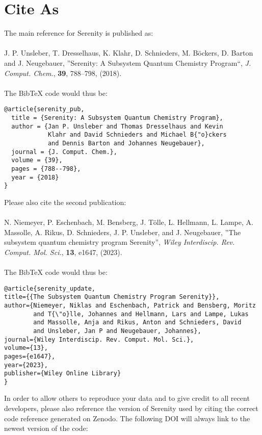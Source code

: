 \chapter{Cite As}
The main reference for Serenity is published as:\\
\\
J. P. Unsleber, T. Dresselhaus, K. Klahr, D. Schnieders, M. B{\"o}ckers, D. Barton and J. Neugebauer, ''Serenity: A Subsystem Quantum Chemistry Program``,
 \textit{J. Comput. Chem.}, \textbf{39}, 788--798, (2018).\\
\\
The BibTeX code would thus be:
\begin{lstlisting}
@article{serenity_pub,
  title = {Serenity: A Subsystem Quantum Chemistry Program},
  author = {Jan P. Unsleber and Thomas Dresselhaus and Kevin
            Klahr and David Schnieders and Michael B{"o}ckers
            and Dennis Barton and Johannes Neugebauer},
  journal = {J. Comput. Chem.},
  volume = {39},
  pages = {788--798},
  year = {2018}
}
\end{lstlisting}
Please also cite the second publication:\\
\\
N. Niemeyer, P. Eschenbach, M. Bensberg, J. T{\"o}lle, L. Hellmann, L. Lampe, A. Massolle, A. Rikus, D. Schnieders, J. P. Unsleber, and J. Neugebauer,
''The subsystem quantum chemistry program Serenity'',
\textit{Wiley Interdiscip. Rev. Comput. Mol. Sci.}, \textbf{13}, e1647, (2023).\\
\\
The BibTeX code would thus be:  
\begin{lstlisting}
@article{serenity_update,  
title={{The Subsystem Quantum Chemistry Program Serenity}},  
author={Niemeyer, Niklas and Eschenbach, Patrick and Bensberg, Moritz
        and T{\"o}lle, Johannes and Hellmann, Lars and Lampe, Lukas 
        and Massolle, Anja and Rikus, Anton and Schnieders, David 
        and Unsleber, Jan P and Neugebauer, Johannes},  
journal={Wiley Interdiscip. Rev. Comput. Mol. Sci.},  
volume={13},  
pages={e1647},  
year={2023},  
publisher={Wiley Online Library}
}
\end{lstlisting}
In order to allow others to reproduce your data and to give credit to all recent developers,
please also reference the version of Serenity used by citing the correct code reference
generated on Zenodo. The following DOI will always link to the newest version of the code:\\
\\ 
